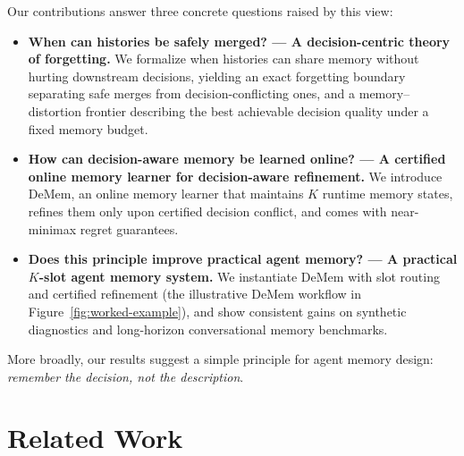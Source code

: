 \documentclass{article}
\theoremstyle{plain}
\theoremstyle{definition}
\theoremstyle{remark}
\begin{document}
Our contributions answer three concrete questions raised by this view:
\begin{itemize}[
    leftmargin=*,
    topsep=0.25em,
    itemsep=0.25em,
    parsep=0pt,
    partopsep=0pt,
    after=\vspace{-0.3em}
]
    \item \textbf{When can histories be safely merged? --- A decision-centric theory of forgetting.}
    We formalize when histories can share memory without hurting downstream decisions, yielding an exact forgetting boundary separating
    safe merges from decision-conflicting ones, and a memory--distortion frontier
    describing the best achievable decision quality under a fixed memory budget.

    \item \textbf{How can decision-aware memory be learned online? --- A certified online memory learner for decision-aware refinement.}
    We introduce DeMem, an online memory learner that maintains \(K\) runtime memory states, refines them only upon certified decision conflict, and comes with near-minimax regret guarantees.

    \item \textbf{Does this principle improve practical agent memory? --- A practical \(K\)-slot agent memory system.}
    We instantiate DeMem with slot routing and certified refinement (the illustrative DeMem workflow in Figure~\ref{fig:worked-example}), and show consistent gains on synthetic diagnostics and long-horizon conversational memory benchmarks.
\end{itemize}
More broadly, our results suggest a simple principle for agent memory design: \emph{remember the decision, not the description}.

\vspace{-0.5em}
\section{Related Work}
\label{sec:related}
\vspace{-0.5em}
\end{document}
